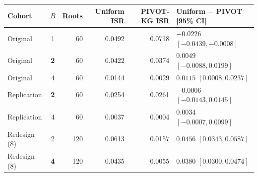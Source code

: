 \begin{tabular*}{\linewidth}{@{\extracolsep{\fill}}lcrrrl@{}}
\toprule
Cohort & $B$ & Roots & Uniform ISR & PIVOT-KG ISR & \shortstack[l]{Uniform $-$ PIVOT\\{[95\% CI]}} \\
\midrule
Original & 1 & 60 & 0.0492 & 0.0718 & $-0.0226$ $[-0.0439,-0.0008]$ \\
Original & \textbf{2} & 60 & 0.0422 & 0.0374 & $0.0049$ $[-0.0088,0.0199]$ \\
Original & 4 & 60 & 0.0144 & 0.0029 & $0.0115$ $[0.0008,0.0237]$ \\
\addlinespace[3pt]
Replication & \textbf{2} & 60 & 0.0254 & 0.0261 & $-0.0006$ $[-0.0143,0.0145]$ \\
Replication & 4 & 60 & 0.0037 & 0.0004 & $0.0034$ $[-0.0007,0.0099]$ \\
\addlinespace[3pt]
Redesign (8) & 2 & 120 & 0.0613 & 0.0157 & $0.0456$ $[0.0343,0.0587]$ \\
Redesign (8) & \textbf{4} & 120 & 0.0435 & 0.0055 & $0.0380$ $[0.0300,0.0474]$ \\
\bottomrule
\end{tabular*}

